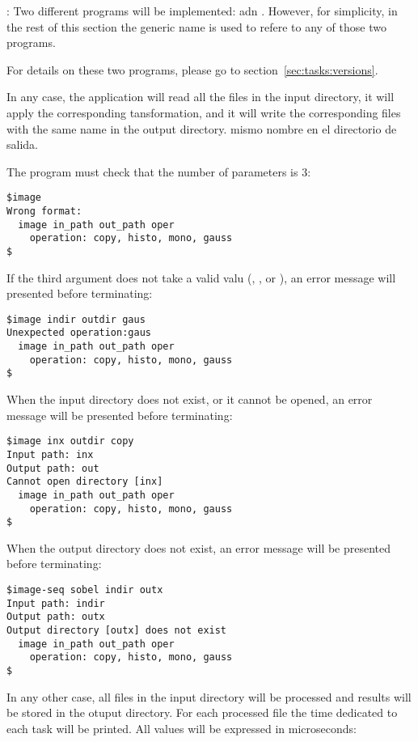 : 
Two different programs will be implemented:  adn .
However, for simplicity, in the rest of this section the generic name 
is used to refere to any of those two programs.

For details on these two programs, please go to section~\ref{sec:tasks:versions}.

In any case, the application will read all the files in the input directory,
it will apply the corresponding tansformation, and it will write the 
corresponding files with the same name in the output directory.
mismo nombre en el directorio de salida.

The program must check that the number of parameters is 3:

\begin{lstlisting}[style=terminal]
$image
Wrong format:
  image in_path out_path oper
    operation: copy, histo, mono, gauss
$
\end{lstlisting}

If the third argument does not take a valid valu
(, ,  or ), 
an error message will presented before terminating:

\begin{lstlisting}[style=terminal]
$image indir outdir gaus
Unexpected operation:gaus
  image in_path out_path oper
    operation: copy, histo, mono, gauss
$
\end{lstlisting}

When the input directory does not exist, or it cannot be opened,
an error message will be presented before terminating:

\begin{lstlisting}[style=terminal]
$image inx outdir copy
Input path: inx
Output path: out
Cannot open directory [inx]
  image in_path out_path oper
    operation: copy, histo, mono, gauss
$
\end{lstlisting}

When the output directory does not exist, 
an error message will be presented before terminating:

\begin{lstlisting}[style=terminal]
$image-seq sobel indir outx
Input path: indir
Output path: outx
Output directory [outx] does not exist
  image in_path out_path oper
    operation: copy, histo, mono, gauss
$
\end{lstlisting}

In any other case, all files in the input directory will be processed
and results will be stored in the otuput directory.
For each processed file the time dedicated to each task will be printed.
All values will be expressed in microseconds:

